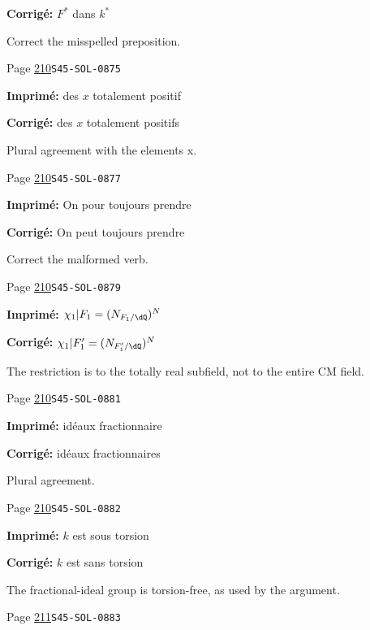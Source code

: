 \begin{description}
\par\noindent\textbf{Corrigé:} $F^\ast$ dans $k^\ast$
\par\noindent Correct the misspelled preposition.
\smallskip
\item[\hypertarget{apparatus:FR-0211}{211}] Page \hyperlink{printpage:fr:210}{210}\quad\texttt{S45-SOL-0875}
\par\noindent\textbf{Imprimé:} des $x$ totalement positif
\par\noindent\textbf{Corrigé:} des $x$ totalement positifs
\par\noindent Plural agreement with the elements x.
\smallskip
\item[\hypertarget{apparatus:FR-0212}{212}] Page \hyperlink{printpage:fr:210}{210}\quad\texttt{S45-SOL-0877}
\par\noindent\textbf{Imprimé:} On pour toujours prendre
\par\noindent\textbf{Corrigé:} On peut toujours prendre
\par\noindent Correct the malformed verb.
\smallskip
\item[\hypertarget{apparatus:FR-0213}{213}] Page \hyperlink{printpage:fr:210}{210}\quad\texttt{S45-SOL-0879}
\par\noindent\textbf{Imprimé:} \(\chi_1|F_1=(N_{F_1/\dQ})^N\)
\par\noindent\textbf{Corrigé:} \(\chi_1|F_1'=(N_{F_1'/\dQ})^N\)
\par\noindent The restriction is to the totally real subfield, not to the entire CM field.
\smallskip
\item[\hypertarget{apparatus:FR-0214}{214}] Page \hyperlink{printpage:fr:210}{210}\quad\texttt{S45-SOL-0881}
\par\noindent\textbf{Imprimé:} idéaux fractionnaire
\par\noindent\textbf{Corrigé:} idéaux fractionnaires
\par\noindent Plural agreement.
\smallskip
\item[\hypertarget{apparatus:FR-0215}{215}] Page \hyperlink{printpage:fr:210}{210}\quad\texttt{S45-SOL-0882}
\par\noindent\textbf{Imprimé:} $k$ est sous torsion
\par\noindent\textbf{Corrigé:} $k$ est sans torsion
\par\noindent The fractional-ideal group is torsion-free, as used by the argument.
\smallskip
\item[\hypertarget{apparatus:FR-0216}{216}] Page \hyperlink{printpage:fr:211}{211}\quad\texttt{S45-SOL-0883}

\end{description}
